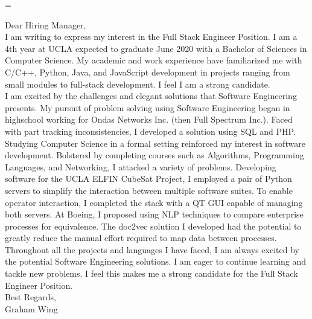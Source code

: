 \emergencystretch=\maxdimen
{}


\begin{minipage}[t]{.95\textwidth} %
\large
Dear Hiring Manager,
\vspace{10pt}\\
I am writing to express my interest in the Full Stack Engineer Position. I am a 4th year at UCLA expected to graduate June 2020 with a Bachelor of Sciences in Computer Science. My academic and work experience have familiarized me with C/C++, Python, Java, and JavaScript development in projects ranging from small modules to full-stack development. I feel I am a strong candidate.
\vspace{6pt}\\
I am excited by the challenges and elegant solutions that Software Engineering presents. My pursuit of problem solving using Software Engineering began in highschool working for Ondas Networks Inc. (then Full Spectrum Inc.). Faced with part tracking inconsistencies, I developed a solution using SQL and PHP. Studying Computer Science in a formal setting reinforced my interest in software development. Bolstered by completing courses such as Algorithms, Programming Languages, and Networking, I attacked a variety of problems. Developing software for the UCLA ELFIN CubeSat Project, I employed a pair of Python servers to simplify the interaction between multiple software suites. To enable operator interaction, I completed the stack with a QT GUI capable of managing both servers. At Boeing, I proposed using NLP techniques to compare enterprise processes for equivalence. The doc2vec solution I developed had the potential to greatly reduce the manual effort required to map data between processes.
\vspace{6pt}\\
Throughout all the projects and languages I have faced, I am always excited by the potential Software Engineering solutions. I am eager to continue learning and tackle new problems. I feel this makes me a strong candidate for the Full Stack Engineer Position.
\vspace{22pt}\\
Best Regards,
\vspace{15pt}\\
Graham Wing


\end{minipage} %
